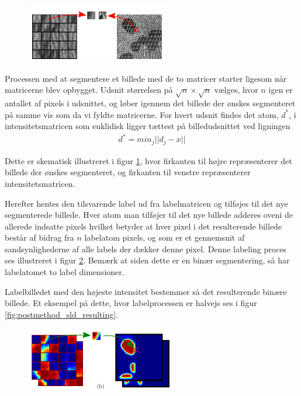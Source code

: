 \begin{figure}[H]
		\centering
		\includegraphics[scale=1]{files/postmethod/img/dict_3.png}
	\caption{\label{fig:postmethod_sld_imagepatch}}
\end{figure}

Processen med at segmentere et billede med de to matricer starter ligesom når matricerne blev opbygget. Udsnit størrelsen på $\sqrt{n}\times\sqrt{n}$ vælges, hvor $n$ igen er antallet af pixels i udsnittet, og løber igennem det billede der ønskes segmenteret på samme vis som da vi fyldte matricerne. For hvert udsnit findes det atom, $d^*$, i intensitetsmatricen som euklidisk ligger tættest på billedudsnittet ved ligningen
\begin{align}
	d^* = min_j ||d_j-x||
\end{align}

Dette er skematisk illustreret i figur \ref{fig:postmethod_sld_imagepatch}, hvor firkanten til højre repræsenterer det billede der ønskes segmenteret, og firkanten til venstre repræsenterer intensitetsmatricen. 

Herefter hentes den tilsvarende label ud fra labelmatricen og tilføjes til det nye segmenterede billede. Hver atom man tilføjer til det nye billede adderes oveni de allerede indsatte pixels hvilket betyder at hver pixel i det resulterende billede består af bidrag fra $n$ labelatom pixels, og som er et gennemsnit af sandsynlighederne af alle labels der dækker denne pixel. Denne labeling proces ses illustreret i figur \ref{fig:postmethod_sld_labelpatch}. Bemærk at siden dette er en binær segmentering, så har labelatomet to label dimensioner.  

Labelbilledet med den højeste intensitet bestemmer så det resulterende binære billede. Et eksempel på dette, hvor labelprocessen er halvejs ses i figur \ref{fig:postmethod_sld_resulting}.

\begin{figure}[H]
		\centering
		\includegraphics[scale=1]{files/postmethod/img/dict_4.png}
	\caption{\label{fig:postmethod_sld_labelpatch}}
\end{figure}

